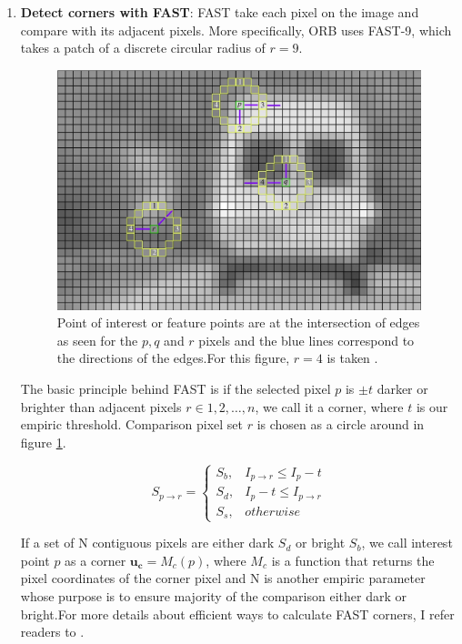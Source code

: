 \documentclass[a4paper]{report}
\numberwithin{figure}{section}
\begin{document}
\begin{enumerate}
	\item \textbf{Detect corners with FAST}: FAST take each pixel on 
	the image and compare with its adjacent pixels. More specifically, 
	ORB uses FAST-9, which takes a patch of a discrete circular radius of 
	$r=9$. 
	\begin{figure}[H]
		\centering
		\includegraphics[width=0.7\linewidth,natwidth=640,natheight=640]
		{fig/ref_imgs/fast.png}
		\caption[FAST Corners]
		{Point of interest or feature points are at the intersection of edges 
			as seen for the $p,q$ and $r$ pixels and the blue lines correspond 
			to 
			the directions of the edges.For this figure, $r=4$ is taken 
			\parencite{Klette2014}.}
		\label{fig:fast_corners}
	\end{figure}
	
	The basic principle behind FAST is if the selected pixel $p$ is $\pm t$ 
	darker or brighter than adjacent pixels $r\in{1,2,\dots,n}$, we call it a 
	corner, where $t$ is our empiric threshold. Comparison pixel set $r$ is 
	chosen as a circle around in figure \ref{fig:fast_corners}.
	
	\begin{equation}
	S_{p \rightarrow r} = 
	\begin{cases}
	S_b, & I_{p \rightarrow r} \leq I_p - t \\
	S_d, & I_p - t \leq I_{p \rightarrow r} \\
	S_s, & otherwise
	\end{cases}
	\end{equation}
	
	If a set of N contiguous pixels are either dark $S_d$ or bright $S_b$, we 
	call interest point $p$ as a corner $\mathbf{u_c} = M_c(p)$, where $M_c$ 
	is a function that returns the pixel coordinates of the corner pixel and N 
	is another empiric parameter whose purpose is to ensure majority of the 
	comparison either dark or bright.For more details about efficient ways to 
	calculate FAST corners, I refer readers to \parencite{Rosten2006}.
	

\end{enumerate}
\end{document}
